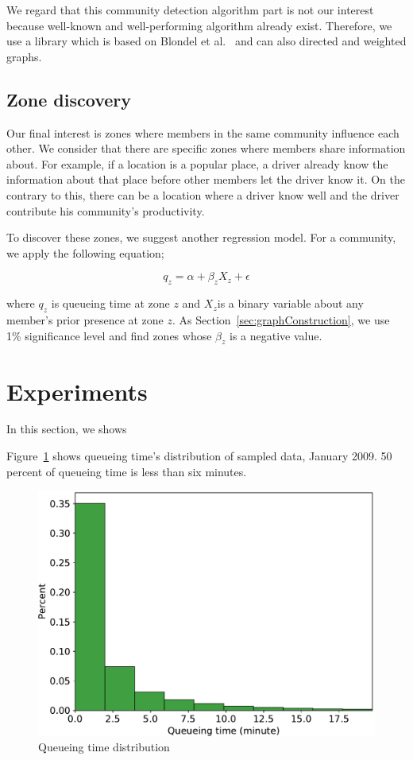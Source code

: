 \documentclass{article}
\begin{document}
We regard that this community detection algorithm part is not our interest because well-known and well-performing algorithm already exist. Therefore, we use a library which is based on  Blondel et al.~ and can also directed and weighted graphs.


\subsection{Zone discovery} \label{sec:zoneDiscovery}

Our final interest is zones where members in the same community influence each other. We consider that there are specific zones where members share information about. For example, if a location is a popular place, a driver already know the information about that place before other members let the driver know it. On the contrary to this, there can be a location where a driver know well and the driver contribute his community's productivity.

To discover these zones, we suggest another regression model. For a community, we apply the following equation;

\begin{equation} \label{eq:zoneRegression}
	q_{z}= \alpha + \beta_{z}X_{z} + \epsilon
\end{equation}

\noindent where $q_{z}$ is queueing time at zone $z$ and $X_{z}$is a binary variable about any member's prior presence at zone $z$. As Section~\ref{sec:graphConstruction}, we use 1\% significance level and find zones whose $\beta_{z}$ is a negative value.

\section{Experiments} \label{sec:experiments}

In this section, we shows 

Figure~\ref{fig:queueTimeDist} shows queueing time's distribution of sampled data, January 2009. 50 percent of queueing time is less than six minutes.

\begin{figure} [h]
  \centering
  \includegraphics[width=.9\linewidth]{figs/queueTimeDist}
  \caption{Queueing time distribution}
  \label{fig:queueTimeDist}
\end{figure}
\end{document}
